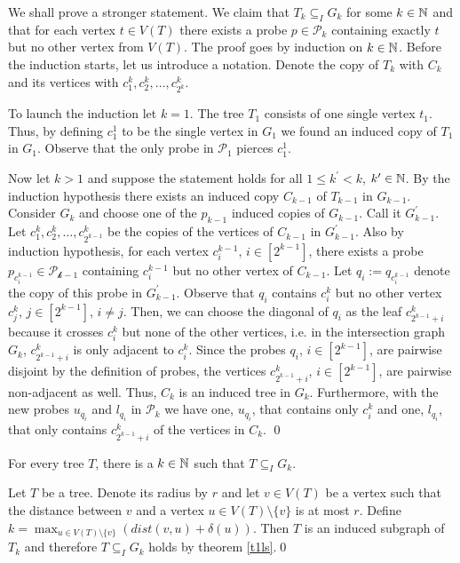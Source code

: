 \begin{prf}
We shall prove a stronger statement. We claim that $T_k\subseteq_I G_k$ for some $k\in\mathbb{N}$ and that for each vertex $t\in V(T)$ there exists a probe $p\in\mathcal{P}_k$ containing exactly $t$ but no other vertex from $V(T)$. The proof goes by induction on $k\in\mathbb{N}$. Before the induction starts, let us introduce a notation. Denote the copy of $T_k$ with $C_k$ and its vertices with $c_1^k, c_2^k, \dots , c_{2^k}^k$.

To launch the induction let $k=1$. The tree $T_1$ consists of one single vertex $t_1$. Thus, by defining $c_1^1$ to be the single vertex in $G_1$ we found an induced copy of $T_1$ in $G_1$. Observe that the only probe in $\mathcal{P}_1$ pierces $c_1^1$.

Now let $k>1$ and suppose the statement holds for all $1\leq k^\prime <k$, $k^\prime\in\mathbb{N}$. By the induction hypothesis there exists an induced copy $C_{k-1}$ of $T_{k-1}$ in $G_{k-1}$. Consider $G_k$ and choose one of the $p_{k-1}$ induced copies of $G_{k-1}$. Call it $G_{k-1}^\prime$. Let $c_1^k, c_2^k,\dots , c_{2^{k-1}}^k$ be the copies of the vertices of $C_{k-1}$ in $G_{k-1}^\prime$. Also by induction hypothesis, for each vertex $c_i^{k-1}$, $i\in [2^{k-1}]$, there exists a probe $p_{c_i^{k-1}}\in\mathcal{P_{k-1}}$ containing $c_i^{k-1}$ but no other vertex of $C_{k-1}$. Let $q_i:=q_{c_i^{k-1}}$ denote the copy of this probe in $G_{k-1}^\prime$. Observe that $q_i$ contains $c_i^k$ but no other vertex $c_j^k$, $j\in [2^{k-1}]$, $i\neq j$. Then, we can choose the diagonal of $q_i$ as the leaf $c_{2^{k-1}+i}^k$ because it crosses $c_i^k$ but none of the other vertices, i.e. in the intersection graph $G_k$, $c_{2^{k-1}+i}^k$ is only adjacent to $c_i^k$. Since the probes $q_i$, $i\in [2^{k-1}]$, are pairwise disjoint by the definition of probes, the vertices $c_{2^{k-1}+i}^k$, $i\in [2^{k-1}]$, are pairwise non-adjacent as well. Thus, $C_k$ is an induced tree in $G_k$. Furthermore, with the new probes $u_{q_i}$ and $l_{q_i}$ in $\mathcal{P}_k$ we have one, $u_{q_i}$, that contains only $c_i^k$ and one, $l_{q_i}$, that only contains $c_{2^{k-1}+i}^k$ of the vertices in $C_k$. \qed
\end{prf}

\begin{cor}
For every tree $T$, there is a $k\in\mathbb{N}$ such that $T\subseteq_I G_k$.
\end{cor}
\begin{prf}
Let $T$ be a tree. Denote its radius by $r$ and let $v\in V(T)$ be a vertex such that the distance between $v$ and a vertex $u\in V(T)\setminus \lbrace v\rbrace$ is at most $r$. Define $k=\max_{u\in V(T)\setminus \lbrace v\rbrace} (dist(v,u)+\delta (u))$. Then $T$ is an induced subgraph of $T_k$ and therefore $T\subseteq_I G_k$ holds by theorem \ref{t1ls}.\qed
\end{prf}